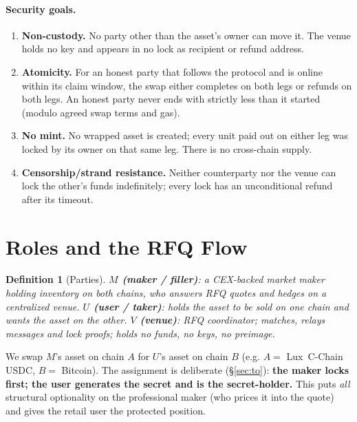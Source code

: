 \documentclass[11pt]{article}
\newtheorem{definition}{Definition}
\begin{document}
\paragraph{Security goals.}
\begin{enumerate}[label=(G\arabic*),leftmargin=3.5em]
  \item \textbf{Non-custody.} No party other than the asset's owner can move it.
        The venue holds no key and appears in no lock as recipient or refund
        address.
  \item \textbf{Atomicity.} For an honest party that follows the protocol and is
        online within its claim window, the swap either completes on both legs
        or refunds on both legs. An honest party never ends with strictly less
        than it started (modulo agreed swap terms and gas).
  \item \textbf{No mint.} No wrapped asset is created; every unit paid out on
        either leg was locked by its owner on that same leg. There is no
        cross-chain supply.
  \item \textbf{Censorship/strand resistance.} Neither counterparty nor the
        venue can lock the other's funds indefinitely; every lock has an
        unconditional refund after its timeout.
\end{enumerate}

\section{Roles and the RFQ Flow}

\begin{definition}[Parties]
\textbf{$M$ (maker / filler)}: a CEX-backed market maker holding inventory on
both chains, who answers RFQ quotes and hedges on a centralized venue.
\textbf{$U$ (user / taker)}: holds the asset to be sold on one chain and wants
the asset on the other. \textbf{$V$ (venue)}: RFQ coordinator; matches, relays
messages and lock proofs; holds no funds, no keys, no preimage.
\end{definition}

We swap $M$'s asset on chain $A$ for $U$'s asset on chain $B$ (e.g. $A=$
Lux~C-Chain USDC, $B=$ Bitcoin). The assignment is deliberate (\S\ref{sec:to}):
\textbf{the maker locks first; the user generates the secret and is the
secret-holder.} This puts \emph{all} structural optionality on the professional
maker (who prices it into the quote) and gives the retail user the protected
position.
\end{document}
